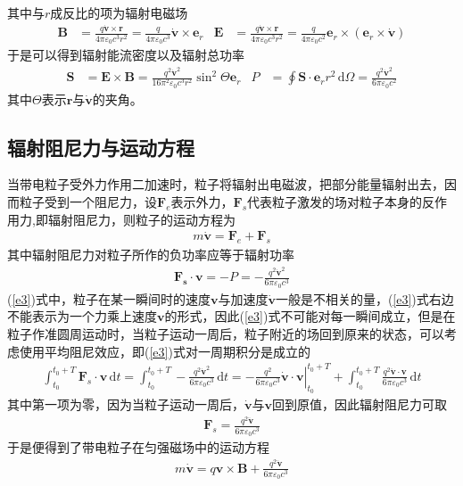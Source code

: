 \documentclass{article} %
\begin{document}
其中与$r$成反比的项为辐射电磁场
\begin{align*}
  \pmb{B}&=\frac{q\dot{\pmb{v}}\times \pmb{r}}{4\pi\varepsilon_0 c^3 r^2}=\frac{q}{4\pi\varepsilon_0 c^3}\dot{\pmb{v}}\times \pmb{e}_r&
  \pmb{E}&=\frac{q\dot{\pmb{v}}\times \pmb{r}}{4\pi\varepsilon_0 c^3 r^2}=\frac{q}{4\pi\varepsilon_0 c^2}\pmb{e}_r\times\left( \pmb{e}_r\times\dot{\pmb{v}} \right)
\end{align*}
于是可以得到辐射能流密度以及辐射总功率
\begin{align*}
  \pmb{S}&=\pmb{E}\times\pmb{B}=\frac{q^2\dot{\pmb{v}}^2}{16\pi^2\varepsilon_0 c^3 r^2}\sin^2{\Theta}\pmb{e}_r&
  P&=\oint \pmb{S}\cdot\pmb{e}_r r^2 \,\mathrm{d}\Omega=\frac{q^2\dot{\pmb{v}}^2}{6\pi\varepsilon_0 c^2} 
\end{align*}
其中$\Theta$表示$\pmb{r}$与$\dot{\pmb{v}}$的夹角。
\subsection{辐射阻尼力与运动方程}
当带电粒子受外力作用二加速时，粒子将辐射出电磁波，把部分能量辐射出去，因而粒子受到一个阻尼力，设$\pmb{F}_e$表示外力，$\pmb{F}_s$代表粒子激发的场对粒子本身的反作用力,即辐射阻尼力，则粒子的运动方程为
\begin{align*}
  m\dot{\pmb{v}}=\pmb{F}_e+\pmb{F}_s
\end{align*}
其中辐射阻尼力对粒子所作的负功率应等于辐射功率
\begin{align}
  \pmb{F_s}\cdot\pmb{v}=-P=-\frac{q^2 \dot{\pmb{v}}^2}{6\pi \varepsilon_0 c^3} \label{e3}
\end{align}
(\ref{e3})式中，粒子在某一瞬间时的速度$\pmb{v}$与加速度$\dot{\pmb{v}}$一般是不相关的量，(\ref{e3})式右边不能表示为一个力乘上速度$\pmb{v}$的形式，因此(\ref{e3})式不可能对每一瞬间成立，但是在粒子作准圆周运动时，当粒子运动一周后，粒子附近的场回到原来的状态，可以考虑使用平均阻尼效应，即(\ref{e3})式对一周期积分是成立的
\begin{align*}
  \int_{t_0}^{t_0+T} \pmb{F}_s \cdot \pmb{v} \,\mathrm{d}t=\int_{t_0}^{t_0+T} -\frac{q^2 \dot{\pmb{v}}^2}{6\pi \varepsilon_0 c^3} \,\mathrm{d}t=\left. -\frac{q^2}{6\pi \varepsilon_0 c^3}\dot{\pmb{v}}\cdot\pmb{v}\right| _{t_0}^{t_0+T}+\int_{t_0}^{t_0+T} \frac{q^2 \ddot{\pmb{v}}\cdot\pmb{v}}{6\pi \varepsilon_0 c^3} \,\mathrm{d}t
\end{align*}
其中第一项为零，因为当粒子运动一周后，$\dot{\pmb{v}}$与$\pmb{v}$回到原值，因此辐射阻尼力可取
\begin{align*}
  \pmb{F}_s=\frac{q^2 \ddot{\pmb{v}}}{6\pi \varepsilon_0 c^3}
\end{align*}
于是便得到了带电粒子在匀强磁场中的运动方程
\begin{align}
  m\dot{\pmb{v}}=q\pmb{v}\times \pmb{B}+\frac{q^2 \ddot{\pmb{v}}}{6\pi \varepsilon_0 c^3} \label{e4}
\end{align}
\end{document}
